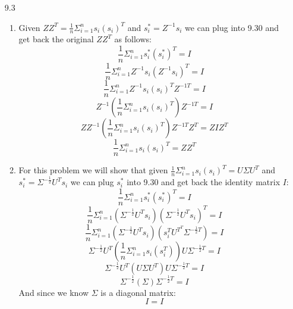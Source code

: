 \documentclass[11pt,a4paper]{article}
\begin{document}
\begin{itemize}
			\item[9.3]
				\begin{enumerate} [label={\alph*)}]
					\item Given $ZZ^T = \frac{1}{n} \Sigma_{i=1}^{n} s_i(s_i)^T$ and $s_i^* = Z^{-1}s_i$ we can plug into 9.30 and get back the original $ZZ^T$ as follows:
					\begin{equation}
						\frac{1}{n} \Sigma_{i=1}^{n} s_i^*(s_i^*)^T = I
					\end{equation}
					\begin{equation}
						\frac{1}{n} \Sigma_{i=1}^{n} Z^{-1}s_i(Z^{-1}s_i)^T = I
					\end{equation}
					\begin{equation}
						\frac{1}{n} \Sigma_{i=1}^{n} Z^{-1}s_i (s_i)^T Z^{-1T}= I
					\end{equation}
					\begin{equation}
						Z^{-1} (\frac{1}{n} \Sigma_{i=1}^{n} s_i (s_i)^T) Z^{-1T}= I
					\end{equation}
					\begin{equation}
						ZZ^{-1} (\frac{1}{n} \Sigma_{i=1}^{n} s_i (s_i)^T) Z^{-1T}Z^T= ZIZ^T
					\end{equation}
					\begin{equation}
						\frac{1}{n} \Sigma_{i=1}^{n} s_i(s_i)^T = ZZ^T
					\end{equation}
					
					\setcounter{equation}{0}
					\item For this problem we will show that given $\frac{1}{n} \Sigma_{i=1}^{n} s_i(s_i)^T = U \Sigma U^T$ and $s_{i}^{*} = \Sigma^{-\frac{1}{2}} U^T s_i$ we can plug $s_i^*$ into 9.30 and get back the identity matrix $I$:
						\begin{equation}
							\frac{1}{n} \Sigma_{i=1}^{n} s_i^*(s_i^*)^T = I
						\end{equation}
						\begin{equation}
							\frac{1}{n} \Sigma_{i=1}^{n} (\Sigma^{-\frac{1}{2}} U^T s_i)(\Sigma^{-\frac{1}{2}} U^T s_i)^T = I
						\end{equation}
						\begin{equation}
							\frac{1}{n} \Sigma_{i=1}^{n} (\Sigma^{-\frac{1}{2}} U^T s_i)(s_i^T  U^{T^T}  \Sigma^{-\frac{1}{2}T}) = I
						\end{equation}
						\begin{equation}
							\Sigma^{-\frac{1}{2}}U^T (\frac{1}{n} \Sigma_{i=1}^{n} s_i(s_i^T))U\Sigma^{-\frac{1}{2}T} = I
						\end{equation}
						\begin{equation}
							\Sigma^{-\frac{1}{2}}U^T (U \Sigma U^T) U\Sigma^{-\frac{1}{2}T} = I
						\end{equation}
						\begin{equation}
							\Sigma^{-\frac{1}{2}}(\Sigma )\Sigma^{-\frac{1}{2}T} = I
						\end{equation}
						And since we know $\Sigma$ is a diagonal matrix:
						\begin{equation}
							I = I
						\end{equation}
						

\end{enumerate}
\end{itemize}
\end{document}
